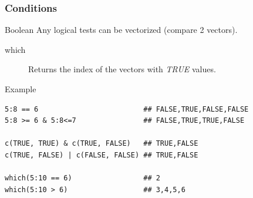 \documentclass[10pt]{beamer}
\newenvironment{xframe}[2][]
  {\begin{frame}[fragile,environment=xframe,#1]
  \frametitle{#2}}
  {\end{frame}}
\begin{document}

\begin{xframe}{Conditions}
  \begin{block}{Boolean}
  Any logical tests can be vectorized (compare 2 {\sf vector}s).
    \begin{description}
    \item[which] Returns the index of the {\sf vector}s with {\it TRUE} values.
    \end{description}
  \end{block}
  \begin{exampleblock}{Example}
\begin{verbatim}
5:8 == 6                         ## FALSE,TRUE,FALSE,FALSE
5:8 >= 6 & 5:8<=7                ## FALSE,TRUE,TRUE,FALSE

c(TRUE, TRUE) & c(TRUE, FALSE)   ## TRUE,FALSE
c(TRUE, FALSE) | c(FALSE, FALSE) ## TRUE,FALSE

which(5:10 == 6)                 ## 2
which(5:10 > 6)                  ## 3,4,5,6
\end{verbatim}  
  \end{exampleblock}
\end{xframe}
\end{document}
